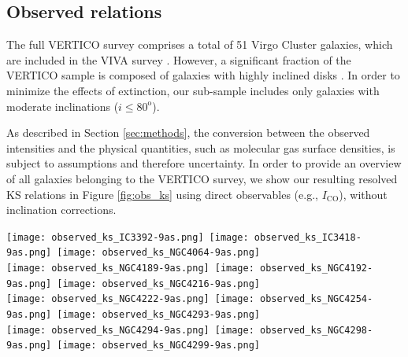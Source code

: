 \documentclass[longauth]{aa}
\begin{document}
\begin{appendix}
\section{Observed relations}
\label{ap:observed}

The full VERTICO survey comprises a total of 51 Virgo Cluster galaxies, which are included in  the  VIVA survey \citep{Chung2009}. However, a significant fraction of the VERTICO sample is composed of galaxies with highly inclined disks \citep[see Table 1 in][for a complete summary of the basic properties of the full VERTICO sample]{Brown2021}. In order to minimize the effects of extinction, our sub-sample includes only galaxies with moderate inclinations ($i\leq80^\mathrm{o}$).

As described in Section \ref{sec:methods}, the conversion between the observed intensities and the physical quantities, such as molecular gas surface densities, is subject to assumptions and therefore uncertainty. In order to provide an overview of all galaxies belonging to the VERTICO survey, we show our resulting resolved KS relations in Figure \ref{fig:obs_ks} using direct observables (e.g., $I_\mathrm{CO}$), without inclination corrections.


\begin{figure*}
\texttt{[image: observed\_ks\_IC3392-9as.png]}\,
\texttt{[image: observed\_ks\_IC3418-9as.png]}\,
\texttt{[image: observed\_ks\_NGC4064-9as.png]}\\

\texttt{[image: observed\_ks\_NGC4189-9as.png]}\,
\texttt{[image: observed\_ks\_NGC4192-9as.png]}\,
\texttt{[image: observed\_ks\_NGC4216-9as.png]}\\

\texttt{[image: observed\_ks\_NGC4222-9as.png]}\,
\texttt{[image: observed\_ks\_NGC4254-9as.png]}\,
\texttt{[image: observed\_ks\_NGC4293-9as.png]}\\

\texttt{[image: observed\_ks\_NGC4294-9as.png]}\,
\texttt{[image: observed\_ks\_NGC4298-9as.png]}\,
\texttt{[image: observed\_ks\_NGC4299-9as.png]}\\

\caption{The resolved Kennicutt-Schmidt relation for all galaxies in the VERTICO sample, using directly observed CO integrated intensities as a proxy for $\Sigma_\textrm{mol}$ as well as the observed $\Sigma_\textrm{SFR}$ (e.g., without a correction for $\textrm{cos}\,i$). All data points are convolved at a common working resolution of 720\,pc. Each data point is color-coded by the distance to the galaxy center. The diagonal dashed, gray lines show constant depletion times of 0.1, 1 and 10\,Gyr, respectively.}
\label{fig:obs_ks}
\end{figure*}


\end{appendix}
\end{document}
